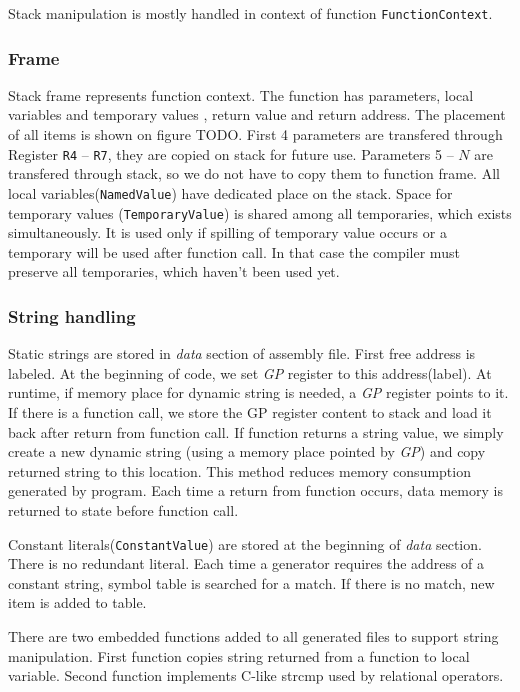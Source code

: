 \documentclass[12pt]{article}
\begin{document}
Stack manipulation is mostly handled in context of function \texttt{FunctionContext}.

\subsubsection{Frame}
Stack frame represents function context. The function has parameters, local variables and temporary values , return value and return address. The placement of all items is shown on figure TODO. First 4 parameters are transfered through Register \texttt{R4} -- \texttt{R7}, they are copied on stack for future use. Parameters 5 -- $N$ are transfered through stack, so we do not have to copy them to function frame. All local variables(\texttt{NamedValue}) have dedicated place on the stack. Space for temporary values (\texttt{TemporaryValue}) is shared among all temporaries, which exists simultaneously. It is used only if spilling of temporary value occurs or a temporary will be used after function call. In that case the compiler must preserve all temporaries, which haven't been used yet.

\subsubsection{String handling}
Static strings are stored in \textit{data} section of assembly file. First free address is labeled. At the beginning of code, we set \textit{GP} register to this address(label). At runtime, if memory place for dynamic string is needed, a \textit{GP} register points to it. If there is a function call, we store the GP register content to stack and load it back after return from function call. If function returns a string value, we simply create a new dynamic string (using a memory place pointed by \textit{GP}) and copy returned string to this location. This method reduces memory consumption generated by program. Each time a return from function occurs, data memory is returned to state before function call.

Constant literals(\texttt{ConstantValue}) are stored at the beginning of \textit{data} section. There is no redundant literal. Each time a generator requires the address of a constant string, symbol table is searched for a match. If there is no match, new item is added to table. 

There are two embedded functions added to all generated files to support string manipulation. First function copies string returned from a function to local variable. Second function implements C-like strcmp used by relational operators.
\end{document}
